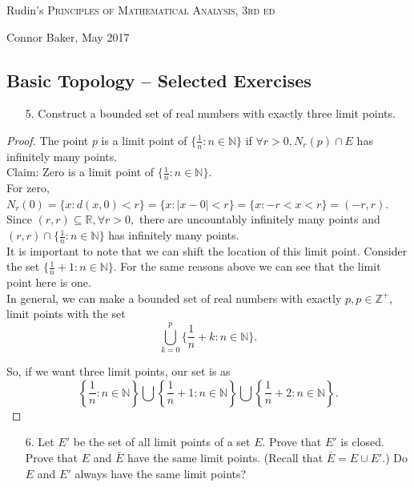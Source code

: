 \documentclass[10pt]{article}
\theoremstyle{definition}
\theoremstyle{plain}
\newcommand{\N}{\mathbb{N}}
\newcommand{\Z}{\mathbb{Z}}
\newcommand{\R}{\mathbb{R}}
\begin{document}

\begin{center}
  {\Large Rudin's \textsc{Principles of Mathematical Analysis, 3rd ed}}

  {\large Connor Baker, May 2017}

  \subsection*{Basic Topology -- Selected Exercises}
\end{center}
\begin{enumerate}
\item[5.] Construct a bounded set of real numbers with exactly three limit points.
\end{enumerate}

\begin{proof}
  The point $p$ is a limit point of $\{\frac{1}{n}:n\in\N\}$ if $\forall r>0, N_r(p)\cap E$ has infinitely many points. \\

  Claim: Zero is a limit point of $\{\frac{1}{n}:n\in\N\}$. \\

  For zero, $N_r(0) = \{x:d(x,0) < r\} = \{x: |x-0| < r\} = \{x: -r <x< r\} = (-r,r)$. Since $(r,r)\subseteq \R, \forall r>0,$ there are uncountably infinitely many points and $(r,r)\cap\{\frac{1}{n}:n\in\N\}$ has infinitely many points. \\

  It is important to note that we can shift the location of this limit point. Consider the set $\{\frac{1}{n}+1:n\in\N\}$. For the same reasons above we can see that the limit point here is one. \\

  In general, we can make a bounded set of real numbers with exactly $p, p\in\Z^+,$ limit points with the set
  $$\bigcup_{k=0}^{p} \{\frac{1}{n}+k: n\in\N\}.$$

  So, if we want three limit points, our set is as
  $$\left\{\frac{1}{n}: n\in\N\right\}\bigcup\left\{\frac{1}{n}+1: n\in\N\right\}\bigcup\left\{\frac{1}{n}+2: n\in\N\right\}.$$
\end{proof}



\pagebreak



\begin{enumerate}
\item[6.] Let $E'$ be the set of all limit points of a set $E$. Prove that $E'$ is closed. Prove that $E$ and $\bar{E}$ have the same limit points. (Recall that $\bar{E} = E \cup E'.$) Do $E$ and $E'$ always have the same limit points?
\end{enumerate}
\end{document}
